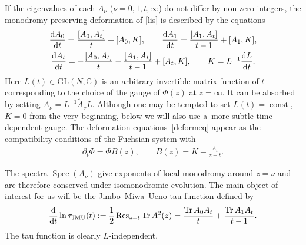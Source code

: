 \documentclass[pdftex]{sigma}
\newcommand\Cb{\mathbb{C}}
\numberwithin{equation}{section}
\begin{document}
If the eigenvalues of each $A_{\nu}$ ($\nu=0,1,t,\infty$) do not differ by non-zero integers, the monodromy preserving deformation of \eqref{lis} is described by the equations
\begin{gather}
\frac{{\rm d}A_0}{{\rm d}t}=\frac{[A_0,A_t]}{t}+[A_0,K],\qquad \frac{{\rm d}A_1}{{\rm d}t}=\frac{[A_1,A_t]}{t-1}+[A_1,K],\nonumber\\ \frac{{\rm d}A_t}{{\rm d}t}=-\frac{[A_0,A_t]}{t}-\frac{[A_1,A_t]}{t-1}+[A_t,K],\qquad K=L^{-1}\frac{{\rm d}L}{{\rm d}t}.\label{deformeq}
\end{gather}
Here $L(t)\in\mathrm{GL}(N,\Cb)$ is an arbitrary invertible matrix function of $t$ corresponding to the choice of the gauge of $\Phi(z)$ at $z=\infty$. It can be absorbed by setting $A_{\nu}=L^{-1}\tilde A_{\nu} L$. Although one may be tempted to set $L(t)=\operatorname{const}$, $K=0$ from the very beginning, below we will also use a~more subtle time-dependent gauge. The deformation equations~\eqref{deformeq} appear as the compatibility conditions of the Fuchsian system with
\begin{gather*}%
\partial_t\Phi=\Phi B(z),\qquad B(z)= K-\frac{A_t}{z-t}.
\end{gather*}

The spectra $\operatorname{\mathrm{Spec}}(A_{\nu})$ give exponents of local monodromy around $z=\nu$ and are therefore conserved under isomonodromic evolution. The main object of interest for us will be the Jimbo--Miwa--Ueno tau function \cite{JMU} defined by{\samepage
\begin{gather}\label{jmutau}
\frac{{\rm d}}{{\rm d}t}\ln\tau_{\mathrm{JMU}}(t):=\frac12\operatorname{Res}_{z=t}\operatorname{Tr} A^2(z)=\frac{\operatorname{Tr}A_0A_t}{t}+\frac{\operatorname{Tr}A_1A_t}{t-1}.
\end{gather}
The tau function is clearly $L$-independent.}
\end{document}
